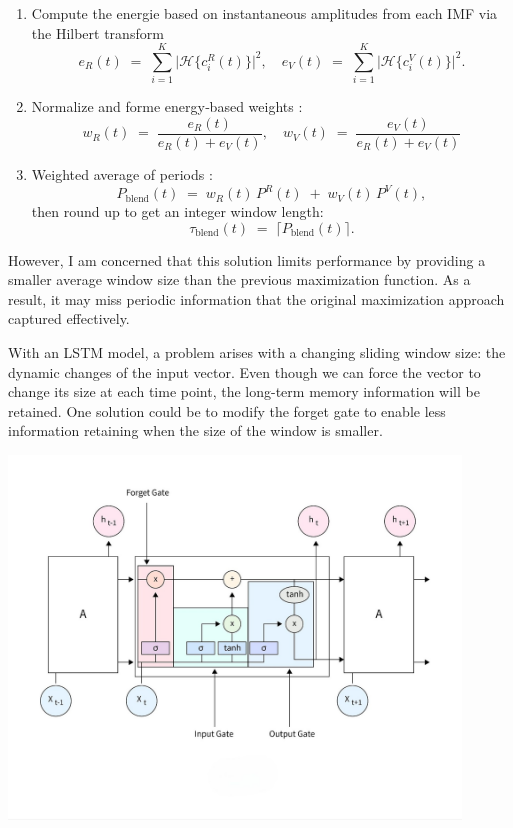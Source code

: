 \documentclass[letterpaper,11pt]{article}
\begin{document}
\begin{enumerate}
  \item Compute the energie based on instantaneous amplitudes from each IMF via the Hilbert transform
  \[
    e_R(t) \;=\; \sum_{i=1}^K \bigl\lvert \mathcal{H}\{c_i^R(t)\}\bigr\rvert^2,
    \quad
    e_V(t) \;=\; \sum_{i=1}^K \bigl\lvert \mathcal{H}\{c_i^V(t)\}\bigr\rvert^2.
  \]

  \item Normalize and forme energy‐based weights :
  \[
    w_R(t) \;=\; \frac{e_R(t)}{e_R(t) + e_V(t)},
    \quad
    w_V(t) \;=\; \frac{e_V(t)}{e_R(t) + e_V(t)}%
  \]

  \item Weighted average of periods :
  \[
    P_{\mathrm{blend}}(t)
      \;=\;
    w_R(t)\,P^R(t)\;+\;w_V(t)\,P^V(t),
  \]
  then round up to get an integer window length:
  \[
    \tau_{\mathrm{blend}}(t)
      \;=\;
    \bigl\lceil P_{\mathrm{blend}}(t)\bigr\rceil.
  \]
\end{enumerate}


However, I am concerned that this solution limits performance by providing a smaller average window size than the previous maximization function. As a result, it may miss periodic information that the original maximization approach captured effectively.
\bigskip

With an LSTM model, a problem arises with a changing sliding window size: the dynamic changes of the input vector. Even though we can force the vector to change its size at each time point, the long-term memory information will be retained. One solution could be to modify the forget gate to enable less information retaining when the size of the window is smaller.


\begin{center}
\includegraphics[width=0.9\textwidth]{img/LSTM_archi.jpg}
\end{center}
\end{document}

